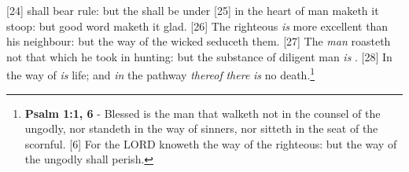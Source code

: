 [24] \textcolor[cmyk]{0.99998,1,0,0}{ shall bear rule: but the  shall be under }
[25] \textcolor[cmyk]{0.99998,1,0,0}{ in the heart of man maketh it stoop: but  good word maketh it glad.}
[26] \textcolor[cmyk]{0.99998,1,0,0}{The righteous \emph{is} more excellent than his neighbour: but the way of the wicked seduceth them.}
[27] \textcolor[cmyk]{0.99998,1,0,0}{The  \emph{man} roasteth not that which he took in hunting: but the substance of  diligent man \emph{is} .}
[28] \textcolor[cmyk]{0.99998,1,0,0}{In the way of  \emph{is} life; and \emph{in} the pathway \emph{thereof} \emph{there} \emph{is} no death.}\footnote{\textbf{Psalm 1:1, 6} - Blessed is the man that walketh not in the counsel of the ungodly, nor standeth in the way of sinners, nor sitteth in the seat of the scornful. [6] For the LORD knoweth the way of the righteous: but the way of the ungodly shall perish.}




